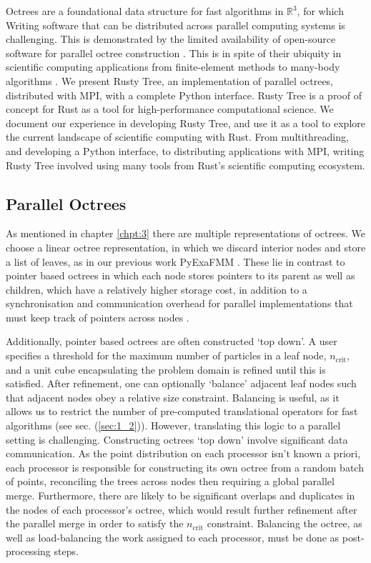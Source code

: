 Octrees are a foundational data structure for fast algorithms in $\mathbb{R}^3$, for which Writing software that can be distributed across parallel computing systems is challenging. This is demonstrated by the limited availability of open-source software for parallel octree construction \cite{BursteddeWilcoxGhattas11,fernando2020github}. This is in spite of their ubiquity in scientific computing applications from finite-element methods to many-body algorithms \cite{sundar2008bottom}. We present Rusty Tree, an implementation of parallel octrees, distributed with MPI, with a complete Python interface. Rusty Tree is a proof of concept for Rust as a tool for high-performance computational science. We document our experience in developing Rusty Tree, and use it as a tool to explore the current landscape of scientific computing with Rust. From multithreading, and developing a Python interface, to distributing applications with MPI, writing Rusty Tree involved using many tools from Rust's scientific computing ecosystem. 

\subsection*{Parallel Octrees}

As mentioned in chapter \ref{chpt:3} there are multiple representations of octrees. We choose a linear octree representation, in which we discard interior nodes and store a list of leaves, as in our previous work PyExaFMM \cite{kailasa2022pyexafmm}. These lie in contrast to pointer based octrees in which each node stores pointers to its parent as well as children, which have a relatively higher storage cost, in addition to a synchronisation and communication overhead for parallel implementations that must keep track of pointers across nodes \cite{tu2005scalable}. 

Additionally, pointer based octrees are often constructed `top down'. A user specifies a threshold for the maximum number of particles in a leaf node, $n_{\text{crit}}$, and a unit cube encapsulating the problem domain is refined until this is satisfied. After refinement, one can optionally `balance' adjacent leaf nodes such that adjacent nodes obey a relative size constraint. Balancing is useful, as it allows us to restrict the number of pre-computed translational operators for fast algorithms (see sec. (\ref{sec:1_2})). However, translating this logic to a parallel setting is challenging. Constructing octrees `top down' involve significant data communication. As the point distribution on each processor isn't known a priori, each processor is responsible for constructing its own octree from a random batch of points, reconciling the trees across nodes then requiring a global parallel merge. Furthermore, there are likely to be significant overlaps and duplicates in the nodes of each processor's octree, which would result further refinement after the parallel merge in order to satisfy the $n_{\text{crit}}$ constraint. Balancing the octree, as well as load-balancing the work assigned to each processor, must be done as post-processing steps.

